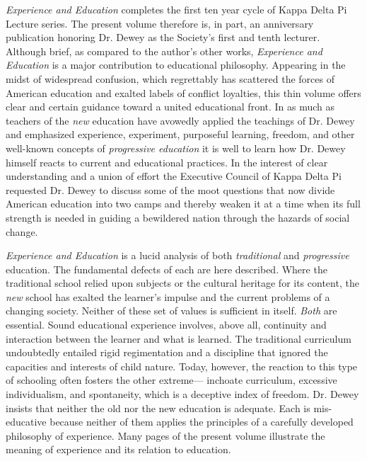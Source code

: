 
\textit{Experience and Education} completes the first ten year cycle of Kappa Delta Pi 
Lecture series. 
The present volume therefore is, in part, an anniversary publication 
honoring Dr. Dewey as the Society’s first and tenth lecturer. Although brief, as compared 
to the author’s other works, \textit{Experience and Education} is a major contribution to educational philosophy. Appearing in the midst of widespread confusion, which 
regrettably has scattered the forces of American education and exalted labels of conflict 
loyalties, this thin volume offers clear and certain guidance toward a united educational 
front. In as much as teachers of the \textit{new} education have avowedly applied the teachings 
of Dr. Dewey and emphasized experience, experiment, purposeful learning, freedom, and 
other well-known concepts of \textit{progressive education} it is well to learn how Dr. Dewey 
himself reacts to current and educational practices. In the interest of clear understanding 
and a union of effort the Executive Council of Kappa Delta Pi requested Dr. Dewey to 
discuss some of the moot questions that now divide American education into two camps 
and thereby weaken it at a time when its full strength is needed in guiding a bewildered 
nation through the hazards of social change. 


\textit{Experience and Education} is a lucid analysis of both \textit{traditional} and \textit{progressive} 
education. The fundamental defects of each are here described. Where the traditional 
school relied upon subjects or the cultural heritage for its content, the \textit{new} school has 
exalted the learner’s impulse and the current problems of a changing society. Neither of 
these set of values is sufficient in itself. \textit{Both} are essential. Sound educational experience 
involves, above all, continuity and interaction between the learner and what is learned. 
The traditional curriculum undoubtedly entailed rigid regimentation and a discipline that 
ignored the capacities and interests of child nature. Today, however, the reaction to this 
type of schooling often fosters the other extreme— inchoate curriculum, excessive 
individualism, and spontaneity, which is a deceptive index of freedom. Dr. Dewey insists 
that neither the old nor the new education is adequate. Each is mis-educative because 
neither of them applies the principles of a carefully developed philosophy of experience. 
Many pages of the present volume illustrate the meaning of experience and its relation to 
education. 

